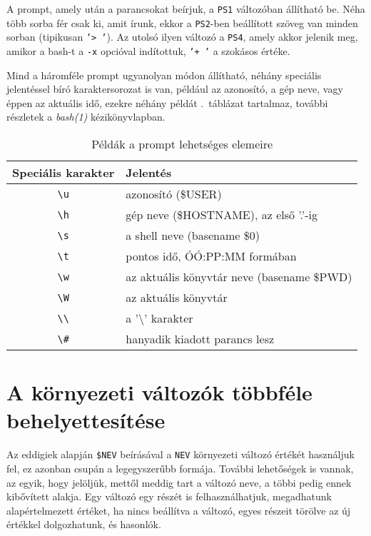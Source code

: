 A prompt, amely után a parancsokat beírjuk, a \texttt{PS1} változóban állítható
be. Néha több sorba fér csak ki, amit írunk, ekkor a \texttt{PS2}-ben beállított
szöveg van minden sorban (tipikusan \texttt{'> '}). Az utolsó ilyen változó a
\texttt{PS4}, amely akkor jelenik meg, amikor a bash-t a \texttt{-x} opcióval
indítottuk, \texttt{'+ '} a szokásos értéke.

Mind a háromféle prompt ugyanolyan módon állítható, néhány speciális jelentéssel
bíró karaktersorozat is van, például az azonosító, a gép neve, vagy éppen az
aktuális idő, ezekre néhány példát .\ táblázat tartalmaz,
további részletek a \textit{bash(1)} kézikönyvlapban.

\begin{table}\centering
\begin{tabular}{@{}cl@{}}\toprule
Speciális karakter & Jelentés\\\midrule
\verb|\u| & azonosító (\$USER)\\
\verb|\h| & gép neve (\$HOSTNAME), az első '.'-ig\\
\verb|\s| & a shell neve (basename \$0)\\
\verb|\t| & pontos idő, ÓÓ:PP:MM formában\\
\verb|\w| & az aktuális könyvtár neve (basename \$PWD)\\
\verb|\W| & az aktuális könyvtár\\
\verb|\\| & a '\textbackslash' karakter\\
\verb|\#| & hanyadik kiadott parancs lesz\\\bottomrule
\end{tabular}
\caption{Példák a prompt lehetséges elemeire}
\label{table:prompt}
\end{table}



\section{A környezeti változók többféle behelyettesítése}
\label{sec:vars-eval}

Az eddigiek alapján \texttt{\$NEV} beírásával a \texttt{NEV} környezeti változó
értékét használjuk fel, ez azonban csupán a legegyszerűbb formája. További
lehetőségek is vannak, az egyik, hogy jelöljük, mettől meddig tart a változó
neve, a többi pedig ennek kibővített alakja. Egy változó egy részét is
felhasználhatjuk, megadhatunk alapértelmezett értéket, ha nincs beállítva a
változó, egyes részeit törölve az új értékkel dolgozhatunk, és hasonlók.


